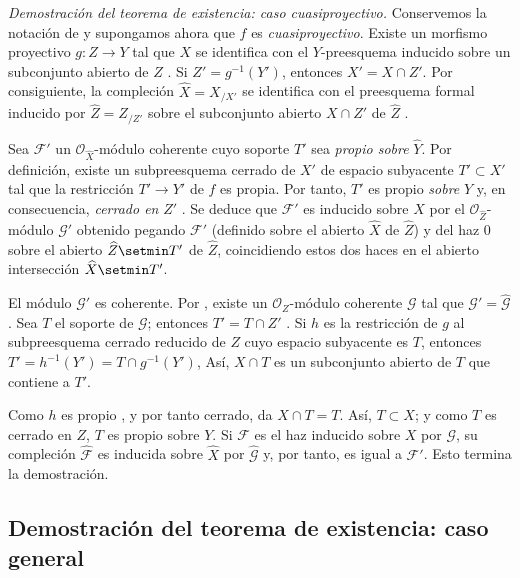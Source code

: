 \begin{env}[5.2.6]
\label{III.5.2.6}
\label{III.5.2.6-fr}
\emph{Demostración del teorema de existencia: caso cuasiproyectivo.}
Conservemos la notación de  y supongamos ahora que $f$
es \emph{cuasiproyectivo}. Existe un morfismo proyectivo
$g:Z\to Y$ tal que $X$ se identifica con el $Y$-preesquema
inducido sobre un subconjunto abierto de $Z$ . Si
$Z'=g^{-1}(Y')$, entonces $X'=X\cap Z'$. Por consiguiente, la compleción
$\widehat X=X_{/X'}$ se identifica con el preesquema formal
inducido por $\widehat Z=Z_{/Z'}$ sobre el subconjunto abierto $X\cap Z'$ de
$\widehat Z$ .

Sea $\mathcal F'$ un $\mathcal O_{\widehat X}$-módulo coherente cuyo
soporte $T'$ sea \emph{propio sobre} $\widehat Y$. Por definición, existe
un subpreesquema cerrado de $X'$ de espacio subyacente
$T'\subset X'$ tal que la restricción $T'\to Y'$ de $f$ es
propia. Por tanto, $T'$ es propio \emph{sobre} $Y$ y, en consecuencia, \emph{cerrado en}
$Z'$ . Se deduce que $\mathcal F'$ es inducido
sobre $\widehat X$ por el $\mathcal O_{\widehat Z}$-módulo $\mathcal G'$
obtenido pegando $\mathcal F'$ (definido sobre el abierto $\widehat X$ de $\widehat Z$) y
del haz $0$ sobre el abierto $\widehat Z\setmin T'$ de $\widehat Z$, coincidiendo estos dos haces
en el abierto intersección $\widehat X\setmin T'$.

El módulo $\mathcal G'$ es coherente. Por , existe un
$\mathcal O_Z$-módulo coherente $\mathcal G$ tal que
$\mathcal G'=\widehat{\mathcal G}$. Sea $T$ el soporte de $\mathcal G$;
entonces $T'=T\cap Z'$ . Si $h$ es la restricción
de $g$ al subpreesquema cerrado reducido de $Z$ cuyo espacio subyacente
es $T$, entonces
$T'=h^{-1}(Y')=T\cap g^{-1}(Y')$,
Así, $X\cap T$ es un subconjunto abierto de $T$ que contiene a $T'$.

Como $h$ es propio , y por tanto cerrado,
 da $X\cap T=T$. Así, $T\subset X$; y
como $T$ es cerrado en $Z$, $T$ es propio sobre $Y$. Si $\mathcal F$ es
el haz inducido sobre $X$ por $\mathcal G$, su compleción
$\widehat{\mathcal F}$ es inducida sobre $\widehat X$ por
$\widehat{\mathcal G}$  y, por tanto, es igual a
$\mathcal F'$. Esto termina la demostración.
\end{env}


\subsection{Demostración del teorema de existencia: caso general}
\label{subsection:III.5.3}
\label{subsection:III.5.3-fr}

